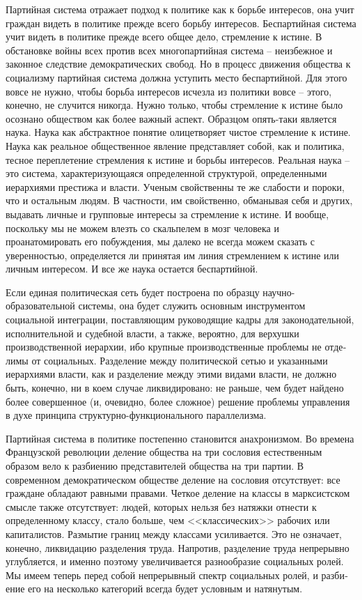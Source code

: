 \documentclass{book}
\begin{document}
Партийная система отражает подход к политике как к борь­бе интересов, она учит граждан видеть в политике прежде всего борьбу интересов. Беспартийная система учит видеть в политике прежде всего общее дело, стремление к истине. В обстанов­ке войны всех против всех многопартийная система -- неиз­бежное и законное следствие демократических свобод. Но в процесс движения общества к социализму партийная система должна уступить место беспартийной. Для этого вовсе не нуж­но, чтобы борьба интересов исчезла из политики вовсе -- этого, конечно, не случится никогда. Нужно только, чтобы стремле­ние к истине было осознано обществом как более важный аспект. Образцом опять-таки является наука. Наука как абстрактное понятие олицетворяет чистое стремление к истине. Наука как реальное общественное явление представляет собой, как и политика, тесное переплетение стремления к истине и борьбы интересов. Реальная наука -- это система, характеризующаяся определенной структурой, определенными иерархиями престижа и власти. Ученым 
свойственны те же слабости и пороки, что и остальным людям. В частности, им свойственно, обманывая себя и других, выдавать личные и групповые интересы за стремление к истине. И вообще, поскольку мы не можем влезть со скальпелем в мозг человека и проанатомировать его побуждения, мы далеко не всегда можем сказать с уверенностью, определяется ли принятая им линия стремле­нием к истине или личным интересом. И все же наука остает­ся беспартийной.

Если единая политическая сеть будет построена по образцу научно-образовательной системы, она будет служить основным инструментом социальной интеграции, поставляющим руково­дящие кадры для законодательной, исполнительной и судебной власти, а также, вероятно, для верхушки производственной иерархии, ибо крупные производственные проблемы не отде­лимы от социальных. Разделение между политической сетью и указанными иерархиями власти, как и разделение между этими видами власти, не должно быть, конечно, ни в коем случае лик­видировано: не раньше, чем будет найдено более совершенное (и, очевидно, более сложное) решение проблемы управления в духе принципа структурно-функционального параллелизма.

Партийная система в политике постепенно становится ана­хронизмом. Во времена Французской революции деление об­щества на три сословия естественным образом вело к разбиению представителей общества на три партии. В современном демократическом обществе деление на сословия отсутствует: все граждане обладают равными правами. Четкое деление на классы в марксистском смысле также отсутствует: людей, которых нельзя без натяжки отнести к определенному классу, стало больше, чем <<классических>> рабочих или капиталистов. Размытие границ между классами усиливается. Это не озна­чает, конечно, ликвидацию разделения труда. Напротив, разде­ление труда непрерывно углубляется, и именно поэтому увеличивается разнообразие социальных ролей. Мы имеем теперь перед собой непрерывный спектр социальных ролей, и разби­ение его на несколько категорий всегда будет условным и на­тянутым.
\end{document}
